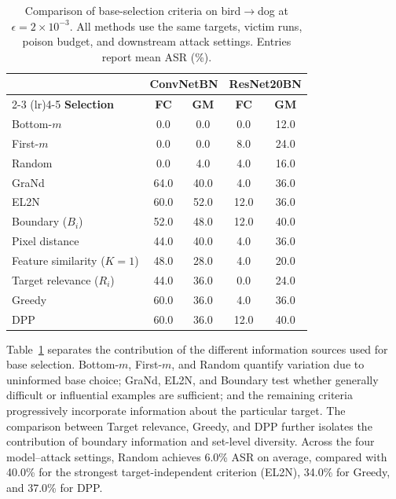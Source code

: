 \begin{table}[!ht]
\centering
\caption{
Comparison of base-selection criteria on bird$\rightarrow$dog at
$\epsilon=2\times10^{-3}$. All methods use the same targets, victim
runs, poison budget, and downstream attack settings. Entries report
mean ASR (\%).
}
\label{tab:selection-ladder}
\small
\setlength{\tabcolsep}{8pt}
\renewcommand{\arraystretch}{1.08}
\begin{tabular}{lcccc}
\toprule
&
\multicolumn{2}{c}{\textbf{ConvNetBN}} &
\multicolumn{2}{c}{\textbf{ResNet20BN}} \\
\cmidrule(lr){2-3}
\cmidrule(lr){4-5}
\textbf{Selection} &
\textbf{FC} &
\textbf{GM} &
\textbf{FC} &
\textbf{GM} \\
\midrule
Bottom-$m$        & 0.0 & 0.0 & 0.0 & 12.0 \\
First-$m$         & 0.0 & 0.0 & 8.0 & 24.0 \\
Random            & 0.0 & 4.0 & 4.0 & 16.0 \\
\midrule
GraNd             & 64.0 & 40.0 & 4.0 & 36.0 \\
EL2N              & 60.0 & 52.0 & 12.0 & 36.0 \\
Boundary ($B_i$)  & 52.0 & 48.0 & 12.0 & 40.0 \\
\midrule
Pixel distance    & 44.0 & 40.0 & 4.0 & 36.0 \\
Feature similarity ($K=1$) & 48.0 & 28.0 & 4.0 & 20.0 \\
Target relevance ($R_i$)    & 44.0 & 36.0 & 0.0 & 24.0 \\
\midrule
Greedy            & 60.0 & 36.0 & 4.0 & 36.0 \\
DPP               & 60.0 & 36.0 & 12.0 & 40.0 \\
\bottomrule
\end{tabular}
\end{table}

Table~\ref{tab:selection-ladder} separates the contribution of the
different information sources used for base selection. Bottom-$m$,
First-$m$, and Random quantify variation due to uninformed base choice;
GraNd, EL2N, and Boundary test whether generally difficult or influential
examples are sufficient; and the remaining criteria progressively
incorporate information about the particular target. The comparison
between Target relevance, Greedy, and DPP further isolates the
contribution of boundary information and set-level diversity. Across
the four model--attack settings, Random achieves 6.0\% ASR on average,
compared with 40.0\% for the strongest target-independent criterion
(EL2N), 34.0\% for Greedy, and 37.0\% for DPP.


